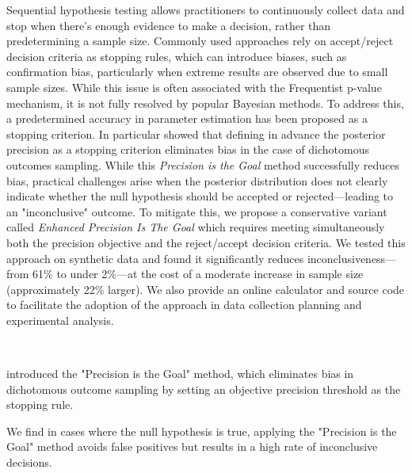 Sequential hypothesis testing allows practitioners to continuously collect data and stop
when there's enough evidence to make a decision, rather than predetermining a sample
size.
Commonly used approaches rely on accept/reject decision criteria as stopping rules,
which can introduce biases, such as confirmation bias,
particularly when extreme results are observed due to small sample sizes.
While this issue is often associated with the Frequentist p-value mechanism,
it is not fully resolved by popular Bayesian methods.
To address this, a predetermined accuracy in parameter estimation has been proposed
as a stopping criterion.
In particular \cite{kruschke2015doing} showed that defining in advance the
posterior precision as a stopping criterion eliminates bias in the
case of dichotomous outcomes sampling.
While this {\it Precision is the Goal} method successfully reduces bias,
practical challenges arise when the posterior distribution does not clearly indicate
whether the null hypothesis should be accepted or rejected—leading to an "inconclusive"
outcome.
To mitigate this, we propose a conservative variant called
{\it Enhanced Precision Is The Goal} which requires meeting simultaneously both the
precision objective and the reject/accept decision criteria.
We tested this approach on synthetic data and found it significantly reduces
inconclusiveness— from 61\% to under 2\%—at the cost of a moderate increase in sample
size (approximately 22\% larger).
We also provide an online calculator and source code to facilitate the adoption of the
approach in data collection planning and experimental analysis.


\
\

\cite{kruschke2015doing} introduced the "Precision is the Goal" method,
which eliminates bias in dichotomous outcome sampling by setting an objective precision threshold as the stopping rule.

We find in cases where the null hypothesis is true,
applying the "Precision is the Goal" method avoids false positives but results in a high rate of inconclusive decisions.


\
\


